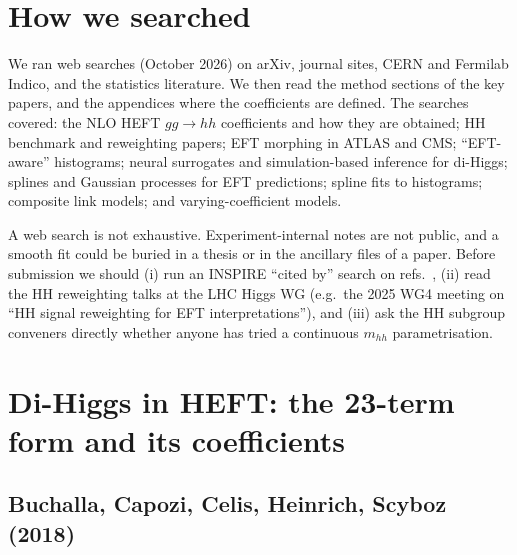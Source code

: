 \section{How we searched}

We ran web searches (October 2026) on arXiv, journal sites, CERN and Fermilab Indico, and
the statistics literature. We then read the method sections of the key papers, and the
appendices where the coefficients are defined. The searches covered: the NLO HEFT
$gg\to hh$ coefficients and how they are obtained; HH benchmark and reweighting papers; EFT
morphing in ATLAS and CMS; ``EFT-aware'' histograms; neural surrogates and simulation-based
inference for di-Higgs; splines and Gaussian processes for EFT predictions; spline fits to
histograms; composite link models; and varying-coefficient models.

\begin{watch}
A web search is not exhaustive. Experiment-internal notes are not public, and a smooth fit
could be buried in a thesis or in the ancillary files of a paper. Before submission we should
(i) run an INSPIRE ``cited by'' search on refs.~\cite{Buchalla2018,Heinrich2020,Alasfar2023},
(ii) read the HH reweighting talks at the LHC Higgs WG (e.g.\ the 2025 WG4 meeting on
``HH signal reweighting for EFT interpretations''), and (iii) ask the HH subgroup conveners
directly whether anyone has tried a continuous $m_{hh}$ parametrisation.
\end{watch}

\section{Di-Higgs in HEFT: the 23-term form and its coefficients}
\label{sec:hh}

\subsection{Buchalla, Capozi, Celis, Heinrich, Scyboz (2018) \cite{Buchalla2018}}
\label{sec:buchalla}

